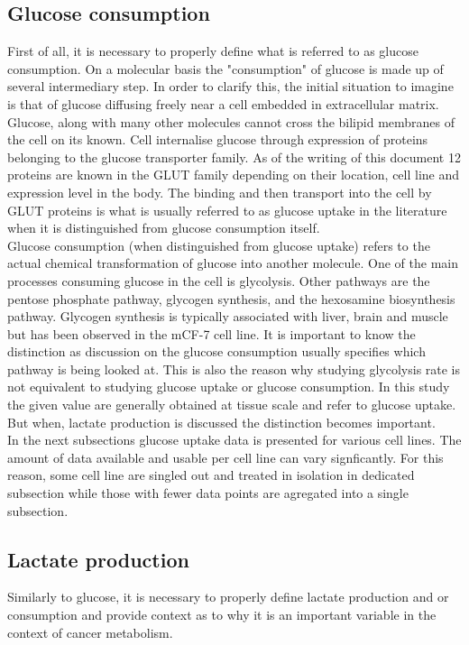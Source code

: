\documentclass[11pt,a4paper]{article}
\begin{document}
\subsection{Glucose consumption}
First of all, it is necessary to properly define what is referred to as glucose consumption. On a molecular basis the "consumption" of glucose is made up of several intermediary step. In order to clarify this, the initial situation to imagine is that of glucose diffusing freely near a cell embedded in extracellular matrix. Glucose, along with many other molecules cannot cross the bilipid membranes of the cell on its known. Cell internalise glucose through expression of proteins belonging to the glucose transporter family. As of the writing of this document 12 proteins are known in the GLUT family depending on their location, cell line and expression level in the body. The binding and then transport into the cell by GLUT proteins is what is usually referred to as glucose uptake in the literature when it is distinguished from glucose consumption itself.\cite{Berg2006}\\

Glucose consumption (when distinguished from glucose uptake) refers to the actual chemical transformation of glucose into another molecule. One of the main processes consuming glucose in the cell is glycolysis. Other pathways are the pentose phosphate pathway, glycogen synthesis, and the hexosamine biosynthesis pathway.\cite{Bouche2004} Glycogen synthesis is typically associated with liver, brain and muscle but has been observed in the mCF-7 cell line.\cite{Altemus2019}\cite{Zois2016}\cite{Shen2010} It is important to know the distinction as discussion on the glucose consumption usually specifies which pathway is being looked at. This is also the reason why studying glycolysis rate is not equivalent to studying glucose uptake or glucose consumption. In this study the given value are generally obtained at tissue scale and refer to glucose uptake. But when, lactate production is discussed the distinction becomes important.\\

In the next subsections glucose uptake data is presented for various cell lines. The amount of data available and usable per cell line can vary signficantly. For this reason, some cell line are singled out and treated in isolation in dedicated subsection while those with fewer data points are agregated into a single subsection.

\subsection{Lactate production}
Similarly to glucose, it is necessary to properly define lactate production and or consumption and provide context as to why it is an important  variable in the context of cancer metabolism.\\
\end{document}
